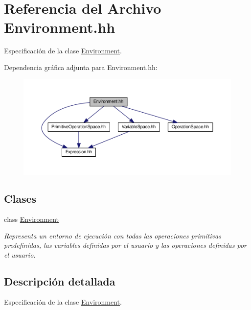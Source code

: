\hypertarget{_environment_8hh}{}\section{Referencia del Archivo Environment.\+hh}
\label{_environment_8hh}


Especificación de la clase \hyperlink{class_environment}{Environment}.  


Dependencia gráfica adjunta para Environment.\+hh\+:\nopagebreak
\begin{figure}[H]
\begin{center}
\leavevmode
\includegraphics[width=350pt]{_environment_8hh__incl}
\end{center}
\end{figure}
\subsection*{Clases}
\begin{DoxyCompactItemize}
\item 
class \hyperlink{class_environment}{Environment}
\begin{DoxyCompactList}\small\item\em Representa un entorno de ejecución con todas las operaciones primitivas predefinidas, las variables definidas por el usuario y las operaciones definidas por el usuario. \end{DoxyCompactList}\end{DoxyCompactItemize}


\subsection{Descripción detallada}
Especificación de la clase \hyperlink{class_environment}{Environment}. 


